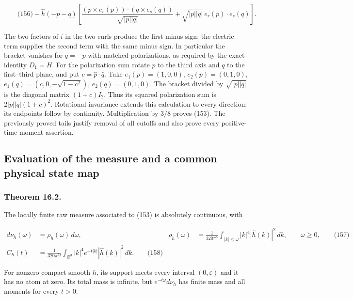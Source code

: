 \[
\qquad\text{(156)}
 -\widehat h(-p-q)\left[
 \frac{ (p\times e_r(p))\cdot(q\times e_s(q))}{\sqrt{|p||q|}}
          +\sqrt{|p||q|}\,e_r(p)\cdot e_s(q)\right].
\]

The two factors of \(i\) in the two curls produce the first minus sign;
the electric term supplies the second term with the same minus sign. In
particular the bracket vanishes for \(q=-p\) with matched polarizations,
as required by the exact identity \(D_1=H\). For the polarization sum
rotate \(p\) to the third axis and \(q\) to the first--third plane, and
put \(c=\widehat p\cdot\widehat q\). Take \(e_1(p)=(1,0,0)\),
\(e_2(p)=(0,1,0)\), \(e_1(q)=(c,0,-\sqrt{1-c^2})\), \(e_2(q)=(0,1,0)\).
The bracket divided by \(\sqrt{|p||q|}\) is the diagonal matrix
\((1+c)I_2\). Thus its squared polarization sum is \(2|p||q|(1+c)^2\).
Rotational invariance extends this calculation to every direction; its
endpoints follow by continuity. Multiplication by \(3/8\) proves (153).
The previously proved tails justify removal of all cutoffs and also
prove every positive-time moment assertion.

\subsection{Evaluation of the measure and a common physical state
map}\label{full-local-spectrum-md-evaluation-of-the-measure-and-a-common-physical-state-map}

\subsubsection{Theorem 16.2.}\label{full-local-spectrum-md-theorem-16.2.}

The locally finite raw measure associated to (153) is absolutely
continuous, with

\[
\begin{aligned}
 d\nu_h(\omega)&=\rho_h(\omega)\,d\omega,&
 \rho_h(\omega)&=\frac{1}{320\pi^5}
       \int_{|k|\le\omega}|k|^4|\widehat h(k)|^2\,dk,
       \qquad \omega\ge0,\qquad\text{(157)}\\
 C_h(t)&=\frac{1}{320\pi^5t}
       \int_{\mathbb R^3}|k|^4 e^{-t|k|}|\widehat h(k)|^2\,dk .
       \qquad\text{(158)}
\end{aligned}
\]

For nonzero compact smooth \(h\), its support meets every interval
\((0,\varepsilon)\) and it has no atom at zero. Its total mass is
infinite, but \(e^{-t\omega}d\nu_h\) has finite mass and all moments for
every \(t>0\).

